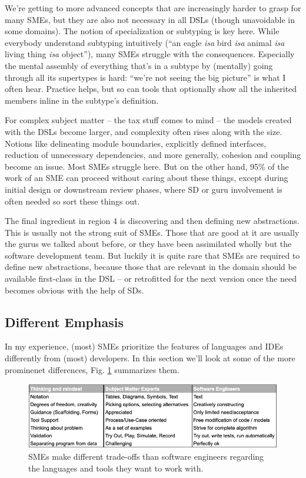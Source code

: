 \documentclass[runningheads]{llncs}
\newcommand{\fig}[1]{Fig. \ref{#1}}  %
\begin{document}
We're getting to more advanced concepts that are increasingly harder to grasp
for many SMEs, but they are also not necessary in all DSLs (though unavoidable
in some domains). The notion of specialization or subtyping is key here. While
everybody understand subtyping intuitively (``an eagle \emph{isa} bird
\emph{isa} animal \emph{isa} living thing \emph{isa} object''), many SMEs
struggle with the consequences. Especially the mental assembly of everything
that's in a subtype by (mentally) going through all its supertypes is hard:
``we're not seeing the big picture'' is what I often hear. Practice helps, but
so can tools that optionally show all the inherited members inline in the
subtype's definition.

For complex subject matter -- the tax stuff comes to mind -- the models created
with the DSLs become larger, and complexity often rises along with the size.
Notions like delineating module boundaries, explicitly defined interfaces,
reduction of unnecessary dependencies, and more generally, cohesion and coupling
become an issue. Most SMEs struggle here. But on the other hand, 95\% of the
work of an SME can proceed without caring about these things, except during
initial design or downstream review phases, where SD or guru involvement is
often needed so sort these things out.

The final ingredient in region 4 is discovering and then defining new
abstractions. This is usually not the strong suit of SMEs. Those that are good
at it are usually the gurus we talked about before, or they have been
assimilated wholly but the software development team. But luckily it is quite
rare that SMEs are required to define new abstractions, because those that are
relevant in the domain should be available first-class in the DSL -- or
retrofitted for the next version once the need becomes obvious with the help
of SDs.
 


\subsection{Different Emphasis}

In my experience, (most) SMEs prioritize the features of languages and IDEs
differently from (most) developers. In this section we'll look at some of the
more prominenet differences, \fig{table-prefs} summarizes them.

\begin{figure}[t]
\begin{center}
    \includegraphics[width=1\columnwidth]{figures/table-prefs.png}
    \caption{SMEs make different trade-offs than software engineers 
    regarding the languages and tools they want to work with.}
    \label{table-prefs}
\end{center} 
\end{figure} 
\end{document}
